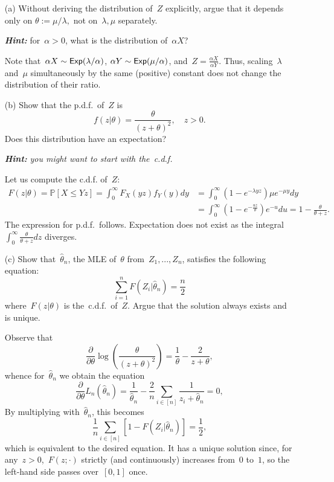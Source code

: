 \documentclass[11pt]{article}
\newcommand{\Prob}{\mathds{P}}
\newcommand{\wh}{\widehat}
\newcommand{\Exp}{\textup{\textsf{Exp}}}
\newcommand{\leqs}{\leqslant}
\renewcommand{\le}{\leqs}
\newcommand{\odima}[1]{{\color{red} #1}}
\begin{document}
\begin{itemize}
\item[(a)] 
Without deriving the distribution of~$Z$ explicitly, argue that it depends only on
$
\theta := {\mu}/{\lambda},
$
not on~$\lambda,\mu$ separately.

{\bf\em Hint:} for~$\alpha > 0$, what is the distribution of~$\alpha X$?

\odima{
Note that~$\alpha X \sim \Exp(\lambda/\alpha)$, $\alpha Y \sim \Exp(\mu/\alpha)$, and~$Z = \frac{\alpha X}{\alpha Y}$. Thus, scaling~$\lambda$ and~$\mu$ simultaneously by the same (positive) constant does not change the distribution of their ratio. 
}

\item[(b)]
Show that the p.d.f.~of~$Z$ is
\[
f(z | \theta) = \frac{\theta}{(z + \theta)^2}, \quad z > 0.
\]
Does this distribution have an expectation?

{\bf\em Hint:} {\em you might want to start with the~c.d.f.}

\odima{
Let us compute the c.d.f. of~$Z$:
\[
\begin{aligned}
F(z|\theta) 
= \Prob\left[ X \le Yz \right] 
= \int_{0}^\infty F_X(yz) f_Y(y) dy 
&= \int_{0}^\infty (1-e^{-\lambda yz}) \mu e^{-\mu y} dy \\
&= \int_{0}^\infty (1-e^{-\frac{uz}{\theta}}) e^{-u} du 
= 1 - \frac{\theta}{\theta+z}.
\end{aligned}
\]
The expression for p.d.f.~follows.
Expectation does not exist as the integral~$\int_{0}^{\infty} \frac{\theta}{\theta+z} dz$ diverges.
}

\item[(c)]
Show that~$\wh \theta_n$, the MLE of~$\theta$ from~$Z_1, ..., Z_n$, satisfies the following equation:
\[
\sum_{i = 1}^n F(Z_i | \wh\theta_n) = \frac{n}{2}
\]
where~$F(z|\theta)$ is the~c.d.f.~of~$Z$. Argue that the solution always exists and is unique. 

\odima{
Observe that
\[
\frac{\partial}{\partial \theta} \log \left( \frac{\theta}{(z + \theta)^2} \right) = \frac{1}{\theta} - \frac{2}{z + \theta}, 
\]
whence for~$\wh\theta_n$ we obtain the equation
\[
\frac{\partial}{\partial \theta} L_n(\wh\theta_n) = \frac{1}{\wh\theta_n} - \frac{2}{n} \sum_{i \in [n]} \frac{1}{z_i+\wh\theta_n} = 0,
\]
By multiplying with~$\wh \theta_n$, this becomes 
\[
\frac{1}{n} \sum_{i \in [n]} [1-F(Z_i|\wh\theta_n)]= \frac{1}{2},
\]
which is equivalent to the desired equation. It has a unique solution since, for any~$z > 0$,~$F(z;\cdot)$ strictly (and continuously) increases from~$0$ to~$1$, so the left-hand side passes over~$[0,1]$ once.
}


\end{itemize}
\end{document}
